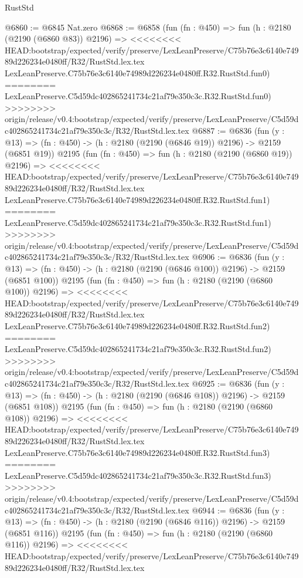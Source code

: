 \begin{lexlean}{RustStd}
\begin{coremodule}
{\begin{coremodule}
{{{{{{{{{{@6860 := @6845 Nat.zero
@6868 := @6858
    (fun (fn : @450) =>
    fun (h : @2180 (@2190 (@6860 @83)) @2196) =>
<<<<<<<< HEAD:bootstrap/expected/verify/preserve/LexLeanPreserve/C75b76e3c6140e74989d226234e0480ff/R32/RustStd.lex.tex
    LexLeanPreserve.C75b76e3c6140e74989d226234e0480ff.R32.RustStd.fun0)
========
    LexLeanPreserve.C5d59dc402865241734c21af79e350c3c.R32.RustStd.fun0)
>>>>>>>> origin/release/v0.4:bootstrap/expected/verify/preserve/LexLeanPreserve/C5d59dc402865241734c21af79e350c3c/R32/RustStd.lex.tex
@6887 := @6836
    (fun (y : @13) => (fn : @450) -> (h : @2180 (@2190 (@6846 @19)) @2196) -> @2159 (@6851 @19))
    @2195
    (fun (fn : @450) =>
    fun (h : @2180 (@2190 (@6860 @19)) @2196) =>
<<<<<<<< HEAD:bootstrap/expected/verify/preserve/LexLeanPreserve/C75b76e3c6140e74989d226234e0480ff/R32/RustStd.lex.tex
    LexLeanPreserve.C75b76e3c6140e74989d226234e0480ff.R32.RustStd.fun1)
========
    LexLeanPreserve.C5d59dc402865241734c21af79e350c3c.R32.RustStd.fun1)
>>>>>>>> origin/release/v0.4:bootstrap/expected/verify/preserve/LexLeanPreserve/C5d59dc402865241734c21af79e350c3c/R32/RustStd.lex.tex
@6906 := @6836
    (fun (y : @13) => (fn : @450) -> (h : @2180 (@2190 (@6846 @100)) @2196) -> @2159 (@6851 @100))
    @2195
    (fun (fn : @450) =>
    fun (h : @2180 (@2190 (@6860 @100)) @2196) =>
<<<<<<<< HEAD:bootstrap/expected/verify/preserve/LexLeanPreserve/C75b76e3c6140e74989d226234e0480ff/R32/RustStd.lex.tex
    LexLeanPreserve.C75b76e3c6140e74989d226234e0480ff.R32.RustStd.fun2)
========
    LexLeanPreserve.C5d59dc402865241734c21af79e350c3c.R32.RustStd.fun2)
>>>>>>>> origin/release/v0.4:bootstrap/expected/verify/preserve/LexLeanPreserve/C5d59dc402865241734c21af79e350c3c/R32/RustStd.lex.tex
@6925 := @6836
    (fun (y : @13) => (fn : @450) -> (h : @2180 (@2190 (@6846 @108)) @2196) -> @2159 (@6851 @108))
    @2195
    (fun (fn : @450) =>
    fun (h : @2180 (@2190 (@6860 @108)) @2196) =>
<<<<<<<< HEAD:bootstrap/expected/verify/preserve/LexLeanPreserve/C75b76e3c6140e74989d226234e0480ff/R32/RustStd.lex.tex
    LexLeanPreserve.C75b76e3c6140e74989d226234e0480ff.R32.RustStd.fun3)
========
    LexLeanPreserve.C5d59dc402865241734c21af79e350c3c.R32.RustStd.fun3)
>>>>>>>> origin/release/v0.4:bootstrap/expected/verify/preserve/LexLeanPreserve/C5d59dc402865241734c21af79e350c3c/R32/RustStd.lex.tex
@6944 := @6836
    (fun (y : @13) => (fn : @450) -> (h : @2180 (@2190 (@6846 @116)) @2196) -> @2159 (@6851 @116))
    @2195
    (fun (fn : @450) =>
    fun (h : @2180 (@2190 (@6860 @116)) @2196) =>
<<<<<<<< HEAD:bootstrap/expected/verify/preserve/LexLeanPreserve/C75b76e3c6140e74989d226234e0480ff/R32/RustStd.lex.tex
}}}}}}}}}}
\end{coremodule}}
\end{coremodule}
\end{lexlean}
